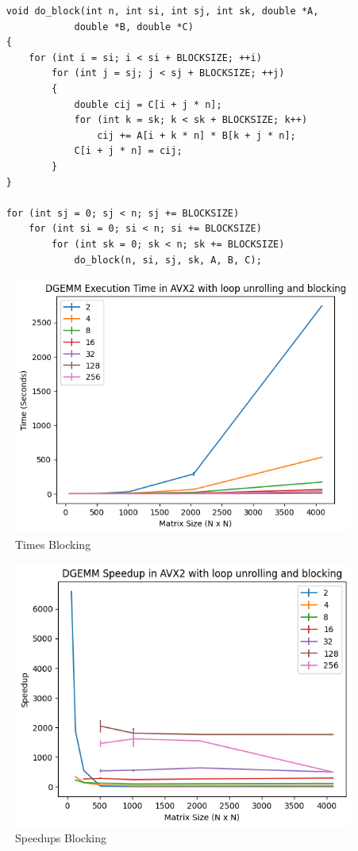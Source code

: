 \documentclass[12pt]{article}
\begin{document}
\begin{lstlisting}
    void do_block(int n, int si, int sj, int sk, double *A, 
                double *B, double *C)
    {
        for (int i = si; i < si + BLOCKSIZE; ++i)
            for (int j = sj; j < sj + BLOCKSIZE; ++j)
            {
                double cij = C[i + j * n];
                for (int k = sk; k < sk + BLOCKSIZE; k++)
                    cij += A[i + k * n] * B[k + j * n];
                C[i + j * n] = cij;
            }
    }

    for (int sj = 0; sj < n; sj += BLOCKSIZE)
        for (int si = 0; si < n; si += BLOCKSIZE)
            for (int sk = 0; sk < n; sk += BLOCKSIZE)
                do_block(n, si, sj, sk, A, B, C);
\end{lstlisting}

\begin{figure}[h]
    \centering
    \includegraphics[scale=0.75]{figures/times_blocking.png}
    \caption{Times Blocking}
    \label{fig:times-blocking}
\end{figure}

\begin{figure}[h]
    \centering
    \includegraphics[scale=0.75]{figures/speedups_blocking.png}
    \caption{Speedups Blocking}
    \label{fig:speedups-blocking}
\end{figure}
\end{document}
